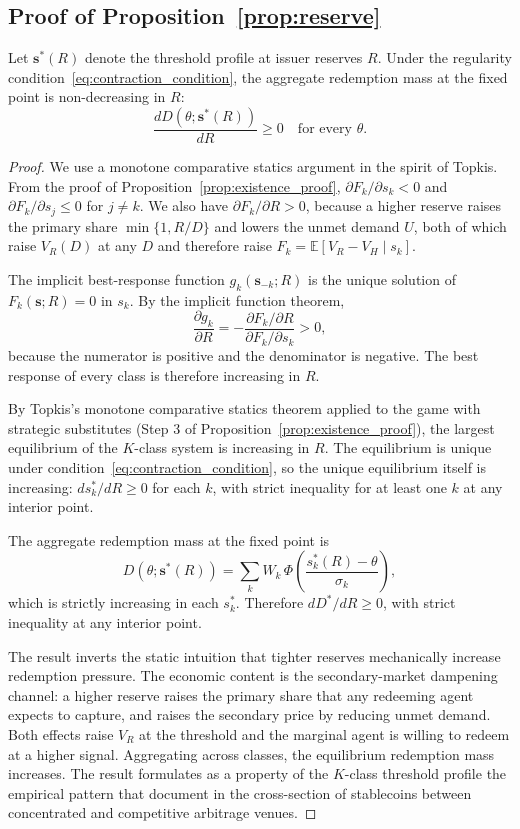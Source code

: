 \subsection*{Proof of Proposition~\ref{prop:reserve}}\label{sub:proof_p2}

\begin{proposition}\label{prop:reserve}
Let $\boldsymbol{s}^*(R)$ denote the threshold profile at issuer reserves $R$. Under the regularity condition~\eqref{eq:contraction_condition}, the aggregate redemption mass at the fixed point is non-decreasing in $R$:
\[
\frac{d D(\theta; \boldsymbol{s}^*(R))}{dR} \geq 0 \quad \text{for every } \theta.
\]
\end{proposition}

\begin{proof}
We use a monotone comparative statics argument in the spirit of Topkis. From the proof of Proposition~\ref{prop:existence_proof}, $\partial F_k / \partial s_k < 0$ and $\partial F_k / \partial s_j \leq 0$ for $j \neq k$. We also have $\partial F_k / \partial R > 0$, because a higher reserve raises the primary share $\min\{1, R/D\}$ and lowers the unmet demand $U$, both of which raise $V_R(D)$ at any $D$ and therefore raise $F_k = \mathbb{E}[V_R - V_H \mid s_k]$.

The implicit best-response function $g_k(\boldsymbol{s}_{-k}; R)$ is the unique solution of $F_k(\boldsymbol{s}; R) = 0$ in $s_k$. By the implicit function theorem,
\[
\frac{\partial g_k}{\partial R} = -\frac{\partial F_k / \partial R}{\partial F_k / \partial s_k} > 0,
\]
because the numerator is positive and the denominator is negative. The best response of every class is therefore increasing in $R$.

By Topkis's monotone comparative statics theorem applied to the game with strategic substitutes (Step 3 of Proposition~\ref{prop:existence_proof}), the largest equilibrium of the $K$-class system is increasing in $R$. The equilibrium is unique under condition~\eqref{eq:contraction_condition}, so the unique equilibrium itself is increasing: $ds_k^*/dR \geq 0$ for each $k$, with strict inequality for at least one $k$ at any interior point.

The aggregate redemption mass at the fixed point is
\[
D(\theta; \boldsymbol{s}^*(R)) = \sum_k W_k \, \Phi\!\left(\frac{s_k^*(R) - \theta}{\sigma_k}\right),
\]
which is strictly increasing in each $s_k^*$. Therefore $dD^*/dR \geq 0$, with strict inequality at any interior point.

The result inverts the static intuition that tighter reserves mechanically increase redemption pressure. The economic content is the secondary-market dampening channel: a higher reserve raises the primary share that any redeeming agent expects to capture, and raises the secondary price by reducing unmet demand. Both effects raise $V_R$ at the threshold and the marginal agent is willing to redeem at a higher signal. Aggregating across classes, the equilibrium redemption mass increases. The result formulates as a property of the $K$-class threshold profile the empirical pattern that \citet{ma_zeng_zhang_2025} document in the cross-section of stablecoins between concentrated and competitive arbitrage venues.
\end{proof}

